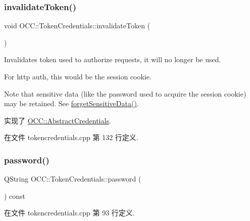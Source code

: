 \subsubsection{\texorpdfstring{invalidate\+Token()}{invalidateToken()}}
{\footnotesize\ttfamily void O\+C\+C\+::\+Token\+Credentials\+::invalidate\+Token (\begin{DoxyParamCaption}{ }\end{DoxyParamCaption})\hspace{0.3cm}{\ttfamily [virtual]}}

Invalidates token used to authorize requests, it will no longer be used.

For http auth, this would be the session cookie.

Note that sensitive data (like the password used to acquire the session cookie) may be retained. See \hyperlink{class_o_c_c_1_1_token_credentials_a5775fc2e216e7e26cf5f1adc764641d7}{forget\+Sensitive\+Data()}. 

实现了 \hyperlink{class_o_c_c_1_1_abstract_credentials_a9c5d9d0c3e4a8fc1ff8cf45efc2f0337}{O\+C\+C\+::\+Abstract\+Credentials}.



在文件 tokencredentials.\+cpp 第 132 行定义.

\mbox{\label{class_o_c_c_1_1_token_credentials_a1e45d852019e4acd897b771c2ba111ea}} 
\subsubsection{\texorpdfstring{password()}{password()}}
{\footnotesize\ttfamily Q\+String O\+C\+C\+::\+Token\+Credentials\+::password (\begin{DoxyParamCaption}{ }\end{DoxyParamCaption}) const}



在文件 tokencredentials.\+cpp 第 93 行定义.

\mbox{\label{class_o_c_c_1_1_token_credentials_a3a158c2e76d58356c976ca410a7e64c1}} 
